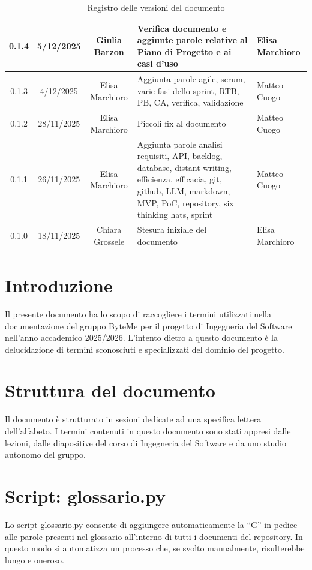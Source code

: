 \documentclass[11pt,a4paper]{article}
\begin{document}
\begin{table}[H]
\begin{tabular}{|c|c|c|>{\raggedright\arraybackslash}p{}|p{}|}
        0.1.4 & 5/12/2025 & Giulia Barzon & Verifica documento e aggiunte parole relative al Piano di Progetto e ai casi d'uso & Elisa Marchioro\\
        \hline
        0.1.3 & 4/12/2025 & Elisa Marchioro & Aggiunta parole agile, scrum, varie fasi dello sprint, RTB, PB, CA, verifica, validazione & Matteo Cuogo\\
        \hline
        0.1.2 & 28/11/2025 & Elisa Marchioro & Piccoli fix al documento & Matteo Cuogo\\
        \hline
        0.1.1 & 26/11/2025 & Elisa Marchioro & Aggiunta parole analisi requisiti, API, backlog, database, distant writing, efficienza, efficacia, git, github, LLM, markdown, MVP, PoC, repository, six thinking hats, sprint & Matteo Cuogo\\
        \hline
        0.1.0 & 18/11/2025 & Chiara Grossele & Stesura iniziale del documento & Elisa Marchioro\\
        \hline
    \end{tabular}
    \caption{Registro delle versioni del documento}
    \label{tab:versionamento}
\end{table}

\newpage

\tableofcontents
\thispagestyle{empty}
\newpage
\setcounter{page}{1}

\section{Introduzione}
Il presente documento ha lo scopo di raccogliere i termini utilizzati nella documentazione del gruppo ByteMe per il progetto di Ingegneria del Software nell'anno accademico 2025/2026.
L'intento dietro a questo documento è la delucidazione di termini sconosciuti e specializzati del dominio del progetto.

\section{Struttura del documento}
Il documento è strutturato in sezioni dedicate ad una specifica lettera dell'alfabeto. I termini contenuti in questo documento sono stati appresi dalle lezioni, dalle diapositive del corso di Ingegneria del Software e da uno studio autonomo del gruppo.

\section{Script: glossario.py}
Lo script glossario.py consente di aggiungere automaticamente la “G” in pedice alle parole presenti nel glossario all’interno di tutti i documenti del repository. In questo modo si automatizza un processo che, se svolto manualmente, risulterebbe lungo e oneroso.
\newpage
\end{document}
